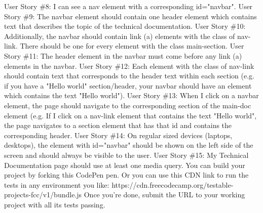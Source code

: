 \documentclass{article}%
\begin{document}
User Story \#8: I can see a nav element with a corresponding id="navbar".\newline%
User Story \#9: The navbar element should contain one header element which contains text that describes the topic of the technical documentation.\newline%
User Story \#10: Additionally, the navbar should contain link (a) elements with the class of nav{-}link. There should be one for every element with the class main{-}section.\newline%
User Story \#11: The header element in the navbar must come before any link (a) elements in the navbar.\newline%
User Story \#12: Each element with the class of nav{-}link should contain text that corresponds to the header text within each section (e.g. if you have a "Hello world" section/header, your navbar should have an element which contains the text "Hello world").\newline%
User Story \#13: When I click on a navbar element, the page should navigate to the corresponding section of the main{-}doc element (e.g. If I click on a nav{-}link element that contains the text "Hello world", the page navigates to a section element that has that id and contains the corresponding header.\newline%
User Story \#14: On regular sized devices (laptops, desktops), the element with id="navbar" should be shown on the left side of the screen and should always be visible to the user.\newline%
User Story \#15: My Technical Documentation page should use at least one media query.\newline%
You can build your project by forking this CodePen pen. Or you can use this CDN link to run the tests in any environment you like: https://cdn.freecodecamp.org/testable{-}projects{-}fcc/v1/bundle.js\newline%
Once you're done, submit the URL to your working project with all its tests passing.\newline%

%
\end{document}
